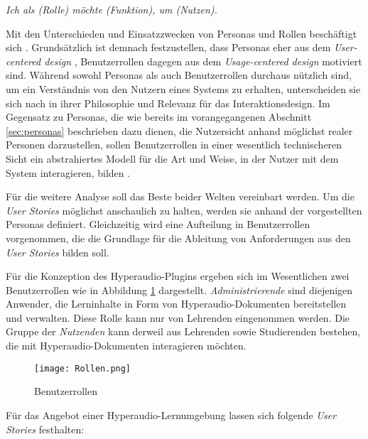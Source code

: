 \par
\begingroup
\leftskip=1cm
\rightskip=1.5cm
\noindent

\textit{Ich als (Rolle) möchte (Funktion), um (Nutzen).}

\par
\endgroup

\vspace{.3cm}

Mit den Unterschieden und Einsatzzwecken von Personas und Rollen beschäftigt sich \cite{constantine2006users}. Grundsätzlich ist demnach festzustellen, dass Personas eher aus dem \textit{User-centered design} \citep{Norman1986user}, Benutzerrollen dagegen aus dem \textit{Usage-centered design} \citep{Constantine1996usage} motiviert sind. Während sowohl Personas als auch Benutzerrollen durchaus nützlich sind, um ein Verständnis von den Nutzern eines Systems zu erhalten, unterscheiden sie sich nach \cite{constantine2006users} in ihrer Philosophie und Relevanz für das Interaktionsdesign. Im Gegensatz zu Personas, die wie bereits im vorangegangenen Abschnitt \ref{sec:personas} beschrieben dazu dienen, die Nutzersicht anhand möglichst realer Personen darzustellen, sollen Benutzerrollen in einer wesentlich technischeren Sicht ein abstrahiertes Modell für die Art und Weise, in der Nutzer mit dem System interagieren, bilden \citep{constantine2006users}.

Für die weitere Analyse soll das Beste beider Welten vereinbart werden. Um die \textit{User Stories} möglichst anschaulich zu halten, werden sie anhand der vorgestellten Personas definiert. Gleichzeitig wird eine Aufteilung in Benutzerrollen vorgenommen, die die Grundlage für die Ableitung von Anforderungen aus den \textit{User Stories} bilden soll.

Für die Konzeption des Hyperaudio-Plugins ergeben sich im Wesentlichen zwei Benutzerrollen wie in Abbildung \ref{fig:Rollen} dargestellt. \textit{Administrierende} sind diejenigen Anwender, die Lerninhalte in Form von Hyperaudio-Dokumenten bereitstellen und verwalten. Diese Rolle kann nur von Lehrenden eingenommen werden. Die Gruppe der \textit{Nutzenden} kann derweil aus Lehrenden sowie Studierenden bestehen, die mit Hyperaudio-Dokumenten interagieren möchten.

\begin{figure}[h!]
\texttt{[image: Rollen.png]}
\caption{\label{fig:Rollen}Benutzerrollen}
\end{figure}


Für das Angebot einer Hyperaudio-Lernumgebung lassen sich folgende \textit{User Stories} festhalten:

